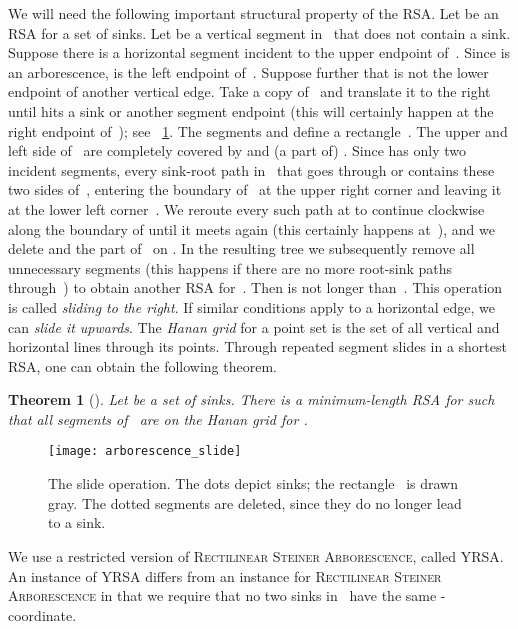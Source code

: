 \documentclass[a4paper,11pt]{article}
\newtheorem{theorem}{Theorem}[section]
\newcommand{\noproof}{~\hfill}
\newcommand{\ShoLong}[2]{#2}
\begin{document}
We will need the following important structural property of the RSA.
Let  be an RSA for a set  of sinks. 
Let  be a vertical segment in~ that does not contain a sink. 
Suppose there is a horizontal segment  incident to the upper endpoint  of~.
Since  is an arborescence,  is the left endpoint of~.
Suppose further that  is not the lower endpoint of another vertical edge.
Take a copy  of~ and translate it to the right until  hits a sink 
or another segment endpoint (this will certainly happen at the right
endpoint of~); see \figurename~\ref{fig_arborescence_slide}.
The segments  and  define a rectangle~.
The upper and left side of~ are completely covered by  and (a part of) .
Since  has only two incident segments, every sink-root path in~ that goes through 
 or  contains these two sides of~, entering the boundary of~ 
at the upper right corner  and leaving it at the lower left corner~.
We reroute every such path at  to continue clockwise along the boundary of 
 until it meets  again (this certainly happens at~), and we 
delete  and the part of~ on .
In the resulting tree we subsequently remove all unnecessary 
segments (this happens if there are no more root-sink paths through~) 
to obtain another RSA  for~.
Then  is not longer than~.
This operation is called \emph{sliding  to the right}.
If similar conditions apply to a horizontal edge, we can \emph{slide it upwards}.
The \emph{Hanan grid} for a point set is the set of all vertical and horizontal 
lines through its points.
Through repeated segment slides in a shortest RSA, one
can obtain the following theorem.
\begin{theorem}[\cite{rao}]\label{thm_slide}
Let  be a set of sinks. There is a minimum-length RSA  for
 such that
all segments of~ are on the Hanan
grid for .\noproof
\end{theorem}
\begin{figure}
\centering
\texttt{[image: arborescence\_slide]}
\caption{The slide operation. The dots depict sinks; the 
rectangle~ is drawn gray.
The dotted segments are deleted, since they do no longer lead to a sink.
}
\label{fig_arborescence_slide}
\end{figure}

We use a restricted version of \textsc{Rectilinear Steiner Arborescence}, 
called YRSA.
An instance  of YRSA differs from an instance for \textsc{Rectilinear
  Steiner Arborescence}
in that we require that no two sinks in~ have the 
same -coordinate.
\ShoLong{The NP-hardness of YRSA follows by a simple perturbation argument; 
see the full version for all omitted proofs.}
{}
\end{document}
